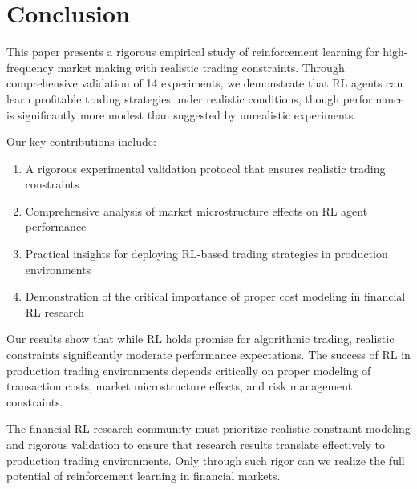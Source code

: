 \documentclass[11pt,a4paper]{article}
\begin{document}
\section{Conclusion}

This paper presents a rigorous empirical study of reinforcement learning for high-frequency market making with realistic trading constraints. Through comprehensive validation of 14 experiments, we demonstrate that RL agents can learn profitable trading strategies under realistic conditions, though performance is significantly more modest than suggested by unrealistic experiments.

Our key contributions include:

\begin{enumerate}
\item A rigorous experimental validation protocol that ensures realistic trading constraints
\item Comprehensive analysis of market microstructure effects on RL agent performance
\item Practical insights for deploying RL-based trading strategies in production environments
\item Demonstration of the critical importance of proper cost modeling in financial RL research
\end{enumerate}

Our results show that while RL holds promise for algorithmic trading, realistic constraints significantly moderate performance expectations. The success of RL in production trading environments depends critically on proper modeling of transaction costs, market microstructure effects, and risk management constraints.

The financial RL research community must prioritize realistic constraint modeling and rigorous validation to ensure that research results translate effectively to production trading environments. Only through such rigor can we realize the full potential of reinforcement learning in financial markets.
\end{document}
